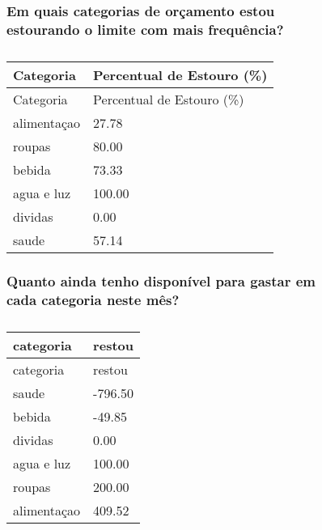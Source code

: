 \documentclass[
  8pt,
  a4paper,
  DIV=11,
  numbers=noendperiod]{scrartcl}
\begin{document}
\begin{figure}

\begin{minipage}{0.50\linewidth}

\subsubsection{Em quais categorias de orçamento estou estourando o
limite com mais
frequência?}\label{em-quais-categorias-de-oruxe7amento-estou-estourando-o-limite-com-mais-frequuxeancia}

\begin{longtable}[]{@{}ll@{}}
\caption{}\label{T_9319c}\tabularnewline
\toprule\noalign{}
Categoria & Percentual de Estouro (\%) \\
\midrule\noalign{}
\endfirsthead
\toprule\noalign{}
Categoria & Percentual de Estouro (\%) \\
\midrule\noalign{}
\endhead
\bottomrule\noalign{}
\endlastfoot
alimentaçao & 27.78 \\
roupas & 80.00 \\
bebida & 73.33 \\
agua e luz & 100.00 \\
dividas & 0.00 \\
saude & 57.14 \\
\end{longtable}

\end{minipage}%
%
\begin{minipage}{0.50\linewidth}

\subsubsection{Quanto ainda tenho disponível para gastar em cada
categoria neste
mês?}\label{quanto-ainda-tenho-disponuxedvel-para-gastar-em-cada-categoria-neste-muxeas}

\begin{longtable}[]{@{}ll@{}}
\caption{}\label{T_bf9e5}\tabularnewline
\toprule\noalign{}
categoria & restou \\
\midrule\noalign{}
\endfirsthead
\toprule\noalign{}
categoria & restou \\
\midrule\noalign{}
\endhead
\bottomrule\noalign{}
\endlastfoot
saude & -796.50 \\
bebida & -49.85 \\
dividas & 0.00 \\
agua e luz & 100.00 \\
roupas & 200.00 \\
alimentaçao & 409.52 \\
\end{longtable}

\end{minipage}%

\end{figure}%
\end{document}

